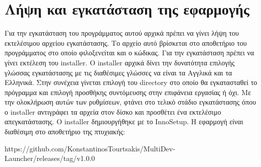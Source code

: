 







\section{Λήψη και εγκατάσταση της εφαρμογής}
Για την εγκατάσταση του προγράμματος αυτού αρχικά πρέπει να γίνει λήψη του εκτελέσιμου
αρχείου εγκατάστασης. Το αρχείο αυτό βρίσκεται στο αποθετήριο του προγράμματος στο οποίο
φιλοξενείται και ο κώδικας. Για την εγκατάσταση πρέπει να γίνει εκτέλεση του installer. Ο
installer αρχικά δίνει την δυνατότητα επιλογής γλώσσας εγκατάστασης με τις διαθέσιμες γλώσσες
να είναι τα Αγγλικά και τα Ελληνικά. Στην συνέχεια γίνεται επιλογή του directory στο οποίο θα
εγκατασταθεί το πρόγραμμα και επιλογή προσθήκης συντόμευσης στην επιφάνεια εργασίας ή όχι. Με
την ολοκλήρωση αυτών των ρυθμίσεων, φτάνει στο τελικό στάδιο εγκατάστασης όπου ο installer 
αντιγράφει τα αρχεία στον δίσκο και προσθέτει ένα εκτελέσιμο απεγκατάστασης. Ο installer
δημιουργήθηκε με το InnoSetup. Η εφαρμογή είναι διαθέσιμη στο αποθετήριο της πτυχιακής: 

https://github.com/KonstantinosTourtsakis/MultiDev-Launcher/releases/tag/v1.0.0
